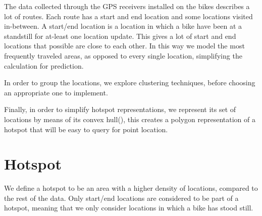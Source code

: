 The data collected through the GPS receivers installed on the bikes describes a lot of routes.
Each route has a start and end location and some locations visited in-between. A start/end location is a location in which a bike have been at a standstill for at-least one location update.
This gives a lot of start and end locations that possible are close to each other.
In this way we model the most frequently traveled areas, as opposed to every single location, simplifying the calculation for prediction.

In order to group the locations, we explore clustering techniques, before choosing an appropriate one to implement.

Finally, in order to simplify hotspot representations, we represent its set of locations by means of its convex hull(\citet[section 33.3]{aadbook}), this creates a polygon representation of a hotspot that will be easy to query for point location.

\section{Hotspot}\label{hotspot}
We define a hotspot to be an area with a higher density of locations, compared to the rest of the data. Only start/end locations are considered to be part of a hotspot, meaning that we only consider locations in which a bike has stood still.